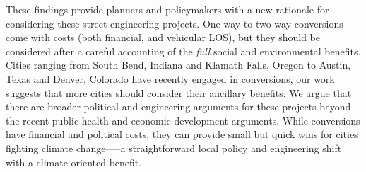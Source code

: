 \documentclass{trbunofficial}
\begin{document}
These findings provide planners and policymakers with a new rationale for considering these street engineering projects. One-way to two-way conversions come with costs (both financial, and vehicular LOS), but they should be considered after a careful accounting of the \textit{full} social and environmental benefits. Cities ranging from South Bend, Indiana and Klamath Falls, Oregon to Austin, Texas and Denver, Colorado have recently engaged in conversions, our work suggests that more cities should consider their ancillary benefits. We argue that there are broader political and engineering arguments for these projects beyond the recent public health and economic development arguments. While conversions have financial and political costs, they can provide small but quick wins for cities fighting climate change--—a straightforward local policy and engineering shift with a climate-oriented benefit. 




\end{document}
